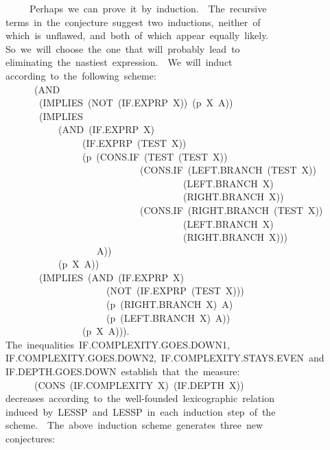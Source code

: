\documentclass[11pt]{book}
\newenvironment{pubasis}{\begin{flushleft}\ttfamily\small}{\normalsize\rmfamily\end{flushleft}}
\begin{document}
\begin{pubasis}
~~~~~Perhaps~we~can~prove~it~by~induction.~~The~recursive\\
terms~in~the~conjecture~suggest~two~inductions,~neither~of\\
which~is~unflawed,~and~both~of~which~appear~equally~likely.\\
So~we~will~choose~the~one~that~will~probably~lead~to\\
eliminating~the~nastiest~expression.~~We~will~induct\\
according~to~the~following~scheme:\\
~~~~~~(AND\\
~~~~~~~(IMPLIES~(NOT~(IF.EXPRP~X))~(p~X~A))\\
~~~~~~~(IMPLIES\\
~~~~~~~~~~~(AND~(IF.EXPRP~X)\\
~~~~~~~~~~~~~~~~(IF.EXPRP~(TEST~X))\\
~~~~~~~~~~~~~~~~(p~(CONS.IF~(TEST~(TEST~X))\\
~~~~~~~~~~~~~~~~~~~~~~~~~~~~(CONS.IF~(LEFT.BRANCH~(TEST~X))\\
~~~~~~~~~~~~~~~~~~~~~~~~~~~~~~~~~~~~~(LEFT.BRANCH~X)\\
~~~~~~~~~~~~~~~~~~~~~~~~~~~~~~~~~~~~~(RIGHT.BRANCH~X))\\
~~~~~~~~~~~~~~~~~~~~~~~~~~~~(CONS.IF~(RIGHT.BRANCH~(TEST~X))\\
~~~~~~~~~~~~~~~~~~~~~~~~~~~~~~~~~~~~~(LEFT.BRANCH~X)\\
~~~~~~~~~~~~~~~~~~~~~~~~~~~~~~~~~~~~~(RIGHT.BRANCH~X)))\\
~~~~~~~~~~~~~~~~~~~A))\\
~~~~~~~~~~~(p~X~A))\\
~~~~~~~(IMPLIES~(AND~(IF.EXPRP~X)\\
~~~~~~~~~~~~~~~~~~~~~(NOT~(IF.EXPRP~(TEST~X)))\\
~~~~~~~~~~~~~~~~~~~~~(p~(RIGHT.BRANCH~X)~A)\\
~~~~~~~~~~~~~~~~~~~~~(p~(LEFT.BRANCH~X)~A))\\
~~~~~~~~~~~~~~~~(p~X~A))).\\
The~inequalities~IF.COM\-PLEX\-I\-TY.GOES.DOWN1,\\
IF.COM\-PLEX\-I\-TY.GOES.DOWN2,~IF.COM\-PLEX\-I\-TY.STAYS.EVEN~and\\
IF.DEPTH.GOES.DOWN~establish~that~the~measure:\\
~~~~~~(CONS~(IF.COM\-PLEX\-I\-TY~X)~(IF.DEPTH~X))\\
decreases~according~to~the~well-founded~lexicographic~relation\\
induced~by~LESSP~and~LESSP~in~each~induction~step~of~the\\
scheme.~~The~above~induction~scheme~generates~three~new\\
conjectures:\\


\end{pubasis}
\end{document}
